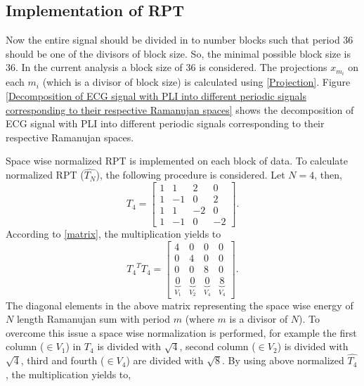 \documentclass[conference]{IEEEtran}
\begin{document}
\subsection{Implementation of RPT}
Now the entire signal should be divided in to number blocks such that period $36$ should be one of the divisors of block size. So, the minimal possible block size is $36$. In the current analysis a block size of $36$ is considered. The projections $x_{m_i}$ on each $m_i$ (which is a divisor of block size) is calculated using \eqref{Projection}. Figure \ref{Decomposition of ECG signal with PLI into different periodic signals corresponding to their respective Ramanujan spaces} shows the decomposition of ECG signal with PLI into different periodic signals corresponding to their respective Ramanujan spaces.

Space wise normalized RPT is implemented on each block of data. To calculate normalized RPT ($\hat{T_N}$), the following procedure is considered. Let $N = 4$, then, 
\begin{equation}
\label{matrix}
T_4 = \begin{bmatrix}
1 & 1 & 2 & 0\\
1 & -1 & 0 & 2 \\
1 & 1 & -2 & 0\\
1 & -1 & 0 & -2
\end{bmatrix}.
\end{equation}
According to \eqref{matrix}, the multiplication yields to
\begin{equation}
{T_4}^{T}{T_4} = \begin{bmatrix}
4 & 0 & 0 & 0\\
0 & 4 & 0 & 0 \\
0 & 0 & 8 & 0\\
\underbrace{0}_{V_1} & \underbrace{0}_{V_2} & \underbrace{0}_{V_4} & \underbrace{8}_{V_4}
\end{bmatrix}.
\end{equation}
The diagonal elements in the above matrix representing the space wise energy of $N$ length Ramanujan sum with period $m$ (where $m$ is a divisor of $N$). To overcome this issue a space wise normalization is performed, for example the first column ($\in{V_1}$) in $T_4$ is divided with $\sqrt{4}$, second column ($\in{V_2}$) is divided with $\sqrt{4}$, third and fourth ($\in{V_4}$) are divided with $\sqrt{8}$. By using above normalized $\hat{T_4}$, the multiplication yields to, 
\end{document}
